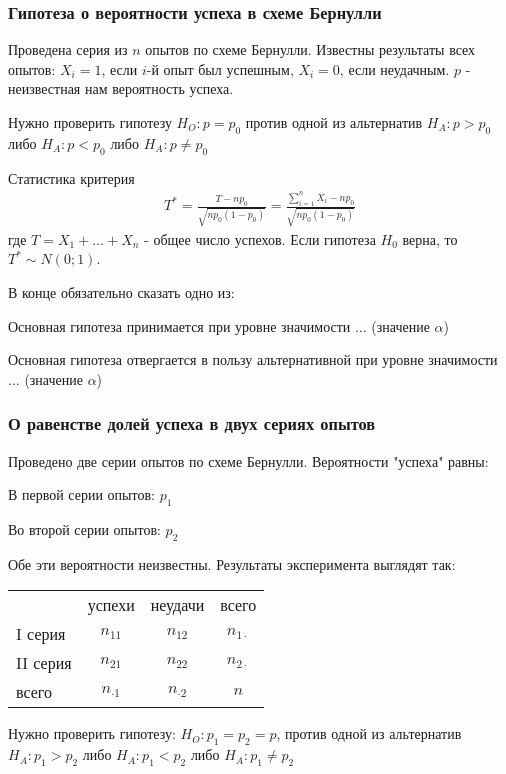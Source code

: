 \documentclass[12pt]{extarticle}
\begin{document}
\subsubsection{Гипотеза о вероятности успеха в схеме Бернулли}
Проведена серия из $n$ опытов по схеме Бернулли. Известны результаты
всех опытов: $X_{i}=1$, если $i$-й опыт был успешным, $X_{i}=0$, если
неудачным. $p$ - неизвестная нам вероятность успеха.
\par Нужно проверить гипотезу $H_{O}:p=p_{0}$ против одной из
альтернатив $H_{A}: p > p_{0}$ либо $H_{A}:p<p_{0}$ либо $H_{A}:p\neq
p_{0}$
\par Статистика критерия
\begin{eqnarray*}
    T^{*} = \frac{T-np_{0}}{\sqrt{np_{0}(1-p_{0})}}
    =\frac{\sum\limits_{i=1}^{n}X_{i}-np_{0}}{\sqrt{np_{0}(1-p_{0})}}
\end{eqnarray*}
где $T=X_{1}+\ldots+X_{n}$ - общее число успехов. Если гипотеза $H_{0}$
верна, то $T^{*}\sim N(0;1)$.
\par В конце обязательно сказать одно из:
\begin{description}
    \item Основная гипотеза принимается при уровне значимости $\ldots$
        (значение $\alpha$)
    \item Основная гипотеза отвергается в пользу альтернативной при
        уровне значимости $\ldots$ (значение $\alpha$)
\end{description}

\subsubsection*{О равенстве долей успеха в двух сериях опытов}
Проведено две серии опытов по схеме Бернулли. Вероятности "успеха"
равны:
\begin{description}
    \item В первой серии опытов: $p_{1}$
    \item Во второй серии опытов: $p_{2}$
\end{description}
Обе эти вероятности неизвестны. Результаты эксперимента выглядят так:
\begin{center}\begin{tabular}{l|c|c|c}
             & успехи & неудачи & всего \\
    I серия  & $n_{11}$ & $n_{12}$ & $n_{1\cdot}$\\\hline
    II серия & $n_{21}$ & $n_{22}$ & $n_{2\cdot}$\\\hline
    всего    & $n_{\cdot 1}$ & $n_{\cdot 2}$ & $n$
\end{tabular}
\end{center}
Нужно проверить гипотезу: $H_{O}: p_{1}=p_{2}=p$, против одной из
альтернатив $H_{A}:p_{1}>p_{2}$ либо $H_{A}:p_{1}<p_{2}$ либо
$H_{A}:p_{1}\neq p_{2}$
\end{document}
